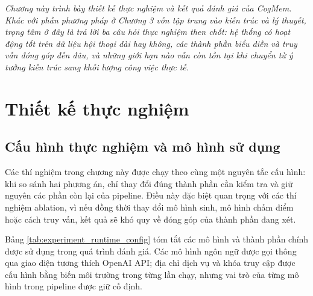\documentclass[../main.tex]{subfiles}
\begin{document}
\textit{Chương này trình bày thiết kế thực nghiệm và kết quả đánh giá của CogMem. Khác với phần phương pháp ở Chương 3 vốn tập trung vào kiến trúc và lý thuyết, trọng tâm ở đây là trả lời ba câu hỏi thực nghiệm then chốt: hệ thống có hoạt động tốt trên dữ liệu hội thoại dài hay không, các thành phần biểu diễn và truy vấn đóng góp đến đâu, và những giới hạn nào vẫn còn tồn tại khi chuyển từ ý tưởng kiến trúc sang khối lượng công việc thực tế.}

\section{Thiết kế thực nghiệm}

\subsection{Cấu hình thực nghiệm và mô hình sử dụng}

Các thí nghiệm trong chương này được chạy theo cùng một nguyên tắc cấu hình: khi so sánh hai phương án, chỉ thay đổi đúng thành phần cần kiểm tra và giữ nguyên các phần còn lại của pipeline. Điều này đặc biệt quan trọng với các thí nghiệm ablation, vì nếu đồng thời thay đổi mô hình sinh, mô hình chấm điểm hoặc cách truy vấn, kết quả sẽ khó quy về đóng góp của thành phần đang xét.

Bảng \ref{tab:experiment_runtime_config} tóm tắt các mô hình và thành phần chính được sử dụng trong quá trình đánh giá. Các mô hình ngôn ngữ được gọi thông qua giao diện tương thích OpenAI API; địa chỉ dịch vụ và khóa truy cập được cấu hình bằng biến môi trường trong từng lần chạy, nhưng vai trò của từng mô hình trong pipeline được giữ cố định.
\end{document}
